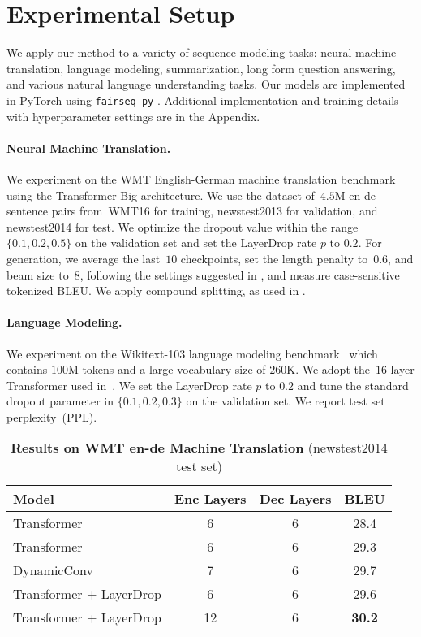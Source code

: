 \section{Experimental Setup}

We apply our method to a variety of sequence modeling tasks: neural machine translation, language modeling, summarization, long form question answering, and various natural language understanding tasks.
Our models are implemented in PyTorch using \texttt{fairseq-py} \citep{ott2019fairseq}. Additional implementation and training details with hyperparameter settings are in the Appendix.

\paragraph{Neural Machine Translation.}

We experiment on the WMT English-German machine translation benchmark using the Transformer Big architecture. We use the dataset of~$4.5$M en-de sentence pairs from~WMT16 \citep{vaswani2017attention} for training, newstest2013 for validation, and newstest2014 for test. We optimize the dropout value within the range $\{0.1, 0.2, 0.5\}$ on the validation set and set the LayerDrop rate $p$ to $0.2$.
For generation, we average the last~$10$ checkpoints, set the length penalty to~$0.6$, and beam size to~$8$, following the settings suggested in \cite{wu2018pay}, and measure case-sensitive tokenized BLEU. We apply compound splitting, as used in \cite{vaswani2017attention}.

\paragraph{Language Modeling.}

We experiment on the Wikitext-103 language modeling benchmark~\citep{merity2016wikitext} which contains $100$M tokens and a large vocabulary size of $260$K.
We adopt the~$16$ layer Transformer used in~\citet{baevski2018adaptive}. We set the LayerDrop rate $p$ to $0.2$ and tune the standard dropout parameter in $\{0.1, 0.2, 0.3\}$ on the validation set.
We report test set perplexity~(PPL).

\begin{table}[t]
    \centering
    \begin{tabular}{lccc}
      \toprule
        Model & Enc Layers & Dec Layers & BLEU  \\
        \midrule
Transformer \citep{vaswani2017attention} & 6 & 6 & 28.4 \\
        Transformer \citep{ott2018scaling} & 6 & 6 & 29.3 \\
        DynamicConv \citep{wu2018pay} & 7 & 6 & 29.7 \\
        \midrule
        Transformer \citep{ott2018scaling} + LayerDrop & 6 & 6 & 29.6 \\
        Transformer \citep{ott2018scaling} + LayerDrop & 12 & 6 & \textbf{30.2}\\
        \bottomrule
    \end{tabular}
        \caption{\textbf{Results on WMT en-de Machine Translation} (newstest2014 test set)}
        \label{tab:nmt_ende}
\end{table}

